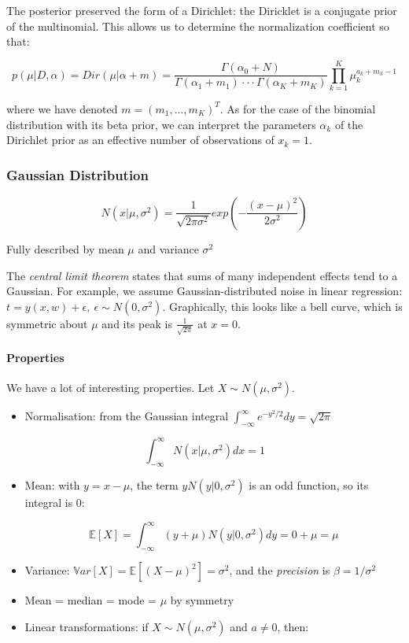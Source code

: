 \documentclass{article}
\begin{document}
The posterior preserved the form of a Dirichlet: the Diricklet is a
conjugate prior of the multinomial. This allows us to determine the
normalization coefficient so that:

\[p (\mu | D, \alpha) = Dir(\mu | \alpha + m) = \frac{\Gamma (\alpha_0 +
N)}{\Gamma (\alpha_1 + m_1) \cdot \cdot \cdot \Gamma(\alpha_K + m_K)} \prod_{k=1}^K \mu_k^{a_k + m_k - 1}\]

where we have denoted \(m = (m_1, ..., m_K)^T\). As for the case of the
binomial distribution with its beta prior, we can interpret the
parameters \(\alpha_k\) of the Dirichlet prior as an effective number of
observations of \(x_k = 1\).

\subsubsection{Gaussian Distribution}\label{gaussian-distribution}

\[N(x| \mu, \sigma^2) = \frac{1}{\sqrt{2\pi \sigma^2}} exp(-\frac{(x-\mu)^2}{2\sigma^2})\]

Fully described by mean \(\mu\) and variance \(\sigma^2\)

The \emph{central limit theorem} states that sums of many independent
effects tend to a Gaussian. For example, we assume Gaussian-distributed
noise in linear regression:
\(t = y(x, w) + \epsilon,\ \epsilon \sim N(0, \sigma^2)\). Graphically,
this looks like a bell curve, which is symmetric about \(\mu\) and its
peak is \(\frac{1}{\sqrt{2\pi}}\) at \(x=0\).

\paragraph{Properties}\label{properties-1}

We have a lot of interesting properties. Let \(X\sim N(\mu, \sigma^2)\).

\begin{itemize}
\tightlist
\item
  Normalisation: from the Gaussian integral
  \(\int_{-\infty}^\infty e^{-y^2/2}dy
  = \sqrt{2\pi}\)
\end{itemize}

\[\int_{-\infty}^{\infty } N(x | \mu, \sigma^2 ) dx = 1\]

\begin{itemize}
\item
  Mean: with \(y=x - \mu\), the term \(y N(y | 0, \sigma^2 )\) is an odd
  function, so its integral is 0:

  \[\mathbb{E}[X] = \int_{-\infty}^{\infty} (y + \mu ) N(y|0, \sigma^2 ) dy = 0
  + \mu = \mu\]
\item
  Variance: \(\mathbb{V}ar[X] = \mathbb{E}[(X - \mu)^2] = \sigma^2\),
  and the \emph{precision} is \(\beta = 1 / \sigma^2\)
\item
  Mean = median = mode = \(\mu\) by symmetry
\item
  Linear transformations: if \(X\sim N(\mu, \sigma^2)\) and \(a\ne 0\),
  then:
\end{itemize}
\end{document}
